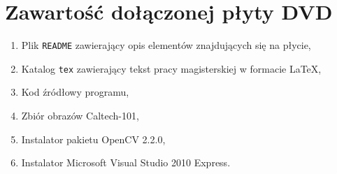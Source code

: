 \chapter{Zawartość dołączonej płyty DVD}

\begin{enumerate}
  \item Plik \texttt{README} zawierający opis elementów znajdujących się na płycie,
  \item Katalog \texttt{tex} zawierający tekst pracy magisterskiej w formacie \LaTeX,
  \item Kod źródłowy programu,
  \item Zbiór obrazów Caltech-101,
  \item Instalator pakietu OpenCV 2.2.0,
  \item Instalator Microsoft Visual Studio 2010 Express.
\end{enumerate}